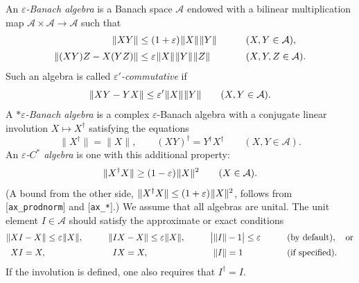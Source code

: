 \hypertarget{def:epsilon-cstar-algebra}{}%
\begin{definition}\label{def:epsilon-cstar-algebra}
An \emph{$\varepsilon$-Banach algebra} is a Banach space $\mathcal{A}$ endowed with a bilinear multiplication map $\mathcal{A}\times \mathcal{A}\to \mathcal{A}$ such that
\begin{alignat*}{2}
\|XY\| &\le (1+\varepsilon)\mkern1mu\|X\|\mkern1mu\|Y\|\qquad &&(X,Y\in \mathcal{A}),\\[2pt]
\|(XY)Z-X(YZ)\| &\le \varepsilon\mkern1mu\|X\|\mkern1mu\|Y\|\mkern1mu\|Z\|\qquad &&(X,Y,Z\in \mathcal{A}).
\end{alignat*}
Such an algebra is called \emph{$\varepsilon'$-commutative} if
\begin{equation*}
\|XY-YX\|\le \varepsilon'\mkern1mu\|X\|\mkern1mu\|Y\|\qquad (X,Y\in \mathcal{A}).
\end{equation*}
A \emph{$*\varepsilon$-Banach algebra} is a complex $\varepsilon$-Banach algebra with a conjugate linear involution $X\mapsto X^\dagger$ satisfying the equations
\begin{equation*}
\|X^\dagger\|=\|X\|,\qquad (XY)^\dagger=Y^\dagger X^\dagger\qquad (X,Y\in \mathcal{A}).
\end{equation*}
An \emph{$\varepsilon$-$C^*$ algebra} is one with this additional property:
\begin{equation*}
\|X^{\dagger}X\|\ge (1-\varepsilon)\mkern1mu\|X\|^{2}\qquad (X\in \mathcal{A}).
\end{equation*}
(A bound from the other side, $\|X^{\dagger}X\|\le (1+\varepsilon)\mkern1mu\|X\|^{2}$, follows from \textup{[\texttt{ax\_prodnorm}]} and \textup{[\texttt{ax\_*}]}.) We assume that all algebras are unital. The unit element $I\in\mathcal{A}$ should satisfy the approximate or exact conditions
\begin{alignat*}{4}
\|XI&-X\|\le\varepsilon\mkern1mu\|X\|,\qquad &\|IX&-X\|\le\varepsilon\mkern1mu\|X\|,\qquad
&\bigl|\|I\|&-1\bigr|\le\varepsilon\qquad &&\text{(by default)},\quad \text{or}\\[2pt]
XI&=X,\qquad &IX&=X,\qquad
&\|I\|&=1\qquad &&\text{(if specified)}.
\end{alignat*}
If the involution is defined, one also requires that $I^\dagger=I$.
\end{definition}
